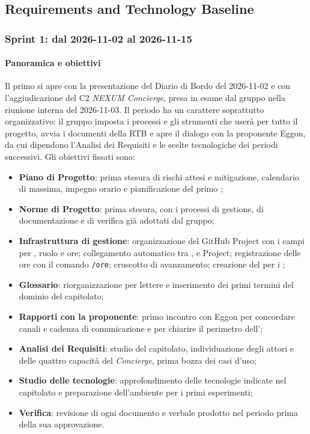 \documentclass[documento]{gpt}
\newcommand{\subsubsubsection}[1]{\paragraph{#1}}
\begin{document}
\subsection{Requirements and Technology Baseline}\label{sec:pianificazione-rtb}

\subsubsection{Sprint 1: dal 2026-11-02 al 2026-11-15}\label{sec:sprint-1}

\subsubsubsection{Panoramica e obiettivi}
Il primo  si apre con la presentazione del Diario di Bordo
del 2026-11-02 e con l'aggiudicazione del  C2
\textit{NEXUM Concierge}, presa in esame dal gruppo nella riunione interna
del 2026-11-03. Il periodo ha un carattere soprattutto organizzativo: il
gruppo imposta i processi e gli strumenti che userà per tutto il progetto,
avvia i documenti della RTB e apre il dialogo con la proponente Eggon, da
cui dipendono l'Analisi dei Requisiti e le scelte tecnologiche dei periodi
successivi. Gli obiettivi fissati sono:
\begin{itemize}
  \item \textbf{Piano di Progetto}: prima stesura di rischi attesi e
        mitigazione, calendario di massima, impegno orario e
        pianificazione del primo ;
  \item \textbf{Norme di Progetto}: prima stesura, con i processi di
        gestione, di documentazione e di verifica già adottati dal gruppo;
  \item \textbf{Infrastruttura di gestione}: organizzazione del GitHub
        Project con i campi per , ruolo e ore;
        collegamento automatico tra , 
        e Project; registrazione delle ore con il comando \texttt{/ore};
        cruscotto di avanzamento; creazione del  per i
        ;
  \item \textbf{Glossario}: riorganizzazione per lettere e inserimento dei
        primi termini del dominio del capitolato;
  \item \textbf{Rapporti con la proponente}: primo incontro con Eggon per
        concordare canali e cadenza di comunicazione e per chiarire il
        perimetro dell';
  \item \textbf{Analisi dei Requisiti}: studio del capitolato,
        individuazione degli attori e delle quattro capacità del
        \textit{Concierge}, prima bozza dei casi d'uso;
  \item \textbf{Studio delle tecnologie}: approfondimento delle tecnologie
        indicate nel capitolato e preparazione dell'ambiente per i primi
        esperimenti;
  \item \textbf{Verifica}: revisione di ogni documento e verbale prodotto
        nel periodo prima della sua approvazione.
\end{itemize}
\end{document}
